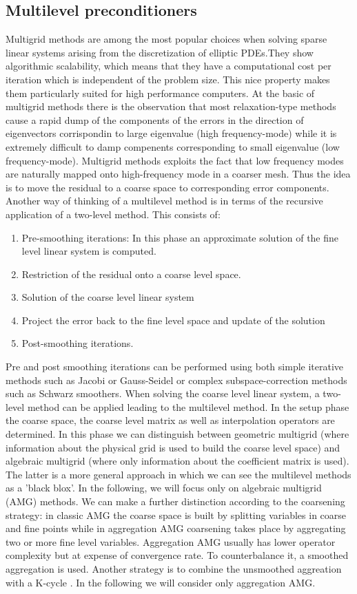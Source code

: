 \documentclass[conference]{IEEEtran}
\begin{document}
\subsection{Multilevel preconditioners}
Multigrid methods are among the most popular choices when solving sparse linear systems arising from the discretization of elliptic PDEs.They show algorithmic scalability, which means that they have a computational cost per iteration which is independent of the problem size. This nice property makes them particularly suited for high performance computers. 
At the basic of multigrid methods there is the observation that most relaxation-type methods cause a rapid dump of the components of the errors in the direction of eigenvectors corrispondin to large eigenvalue (high frequency-mode) while it is extremely difficult to damp compenents corresponding to small eigenvalue (low frequency-mode). Multigrid methods exploits the fact that low frequency modes are naturally mapped onto high-frequency mode in a coarser mesh. Thus the idea is to move the residual to a coarse space to corresponding error components. 
Another way of thinking of a multilevel method is in terms of the recursive application of a two-level method. This consists of:
\begin{enumerate}
\item
Pre-smoothing iterations: In this phase an approximate solution of the fine level linear system is computed.
\item
Restriction of the residual onto a coarse level space.
\item Solution of the coarse level linear system 
\item Project the error back to the fine level space and update of the solution
\item Post-smoothing iterations.  
 \end{enumerate}
 Pre and post smoothing iterations can be performed using both simple iterative methods such as Jacobi or Gauss-Seidel or complex subspace-correction methods such as Schwarz smoothers. When solving the coarse level linear system, a two-level method can be applied leading to the multilevel method.
In the setup phase the coarse space, the coarse level matrix as well as interpolation operators are determined. In this phase we can distinguish between geometric multigrid (where information about the physical grid is used to build the coarse level space) and algebraic multigrid (where only information about the coefficient matrix is used). The latter is a more general approach in which we can see the multilevel methods as a 'black blox'. In the following, we will focus only on algebraic multigrid (AMG) methods. We can make a further distinction according to the coarsening strategy: in classic AMG the coarse space is built by splitting variables in coarse and fine points while in aggregation AMG coarsening takes place by aggregating two or more fine level variables. Aggregation AMG usually has lower operator complexity but at expense of convergence rate. To counterbalance it, a smoothed aggregation is used. Another strategy is to combine the unsmoothed aggreation with a K-cycle \cite{notay2010aggregation}. In the following we will consider only aggregation AMG. 
\end{document}
